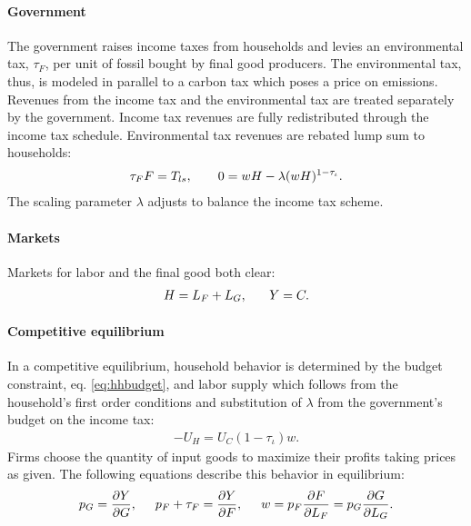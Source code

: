 \paragraph{Government}
The government raises income taxes from households and levies an environmental tax, $\tau_F$, per unit of fossil bought by final good producers. The environmental tax, thus, is modeled in parallel to a carbon tax which poses a price on emissions. Revenues from the income tax and the environmental tax are treated separately by the government. Income tax revenues are fully redistributed through the income tax schedule. Environmental tax revenues are rebated lump sum to households:
\begin{align}
\tau_{F}F=T_{ls}, \hspace{7mm}
0={w H}-\lambda(w H)^{1-\tau_{\iota}}. \label{eq:gov_but}
\end{align}
The scaling parameter $\lambda$ adjusts to balance the income tax scheme. 

\paragraph{Markets}
Markets for labor and the final good both clear: 
\begin{align}
H=L_F+L_G,\ \hspace{5mm} Y=C. \label{eq:market_clear}
\end{align}
\paragraph{Competitive equilibrium}
In a competitive equilibrium, household behavior is determined by the budget constraint, eq. \eqref{eq:hhbudget}, and labor supply which follows from the household's first order conditions and substitution of $\lambda$ from the government's budget on the income tax:
\begin{align}
-U_H=U_C(1-\tau_{\iota})w. \label{eq:hsup}
\end{align}
Firms choose the quantity of input goods to maximize their profits taking prices as given. The following equations describe this behavior in equilibrium:
\begin{align}
p_G=\frac{\partial Y}{\partial G}, \hspace{5mm}
p_F +\tau_{F} = \frac{\partial Y}{\partial F}, \hspace{5mm}
w= p_F\frac{\partial F}{\partial L_F}=p_G\frac{\partial G}{\partial L_G}.\label{eq:profmax}
\end{align}

